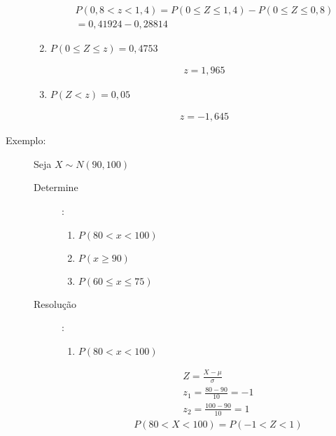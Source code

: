 \begin{description}
\begin{enumerate}[label=(\alph*)]
      \begin{align*}
        P(0,8 < z < 1,4)  = P(0 \leq Z \leq 1,4) - P(0 \leq Z \leq 0,8) \\
        = 0,41924 - 0,28814
      \end{align*}
    \item $P(0 \leq Z \leq z) = 0,4753$
\begin{figure}[H]
            \centering
            
          \end{figure}

      \begin{align*}
       z= 1,965 
      \end{align*}
    \item $P(Z < z) = 0,05$ \begin{figure}[H] \centering
            
          \end{figure}

      \begin{align*}
       z= -1,645 
      \end{align*}
      \end{enumerate}

    \item [Exemplo:] Seja $X \sim N(90,100)$ \\
      \begin{description}
        \item  [Determine]:
      \begin{enumerate}[label=(\alph*)]
        \item $P(80 < x < 100)$
        \item $P(x \geq  90)$
        \item $P(60 \leq x \leq 75 )$
      \end{enumerate}

    \item [Resolução]:
      \begin{enumerate}[label=(\alph*)]
        \item $P(80 < x < 100)$
          \begin{figure}[H]
            \centering
            
            \label{fig:}
          \end{figure}
          \begin{align*}
            Z= \frac{X-\mu  }{\sigma} \\
            z_1 = \frac{80-90}{10}=-1\\
            z_2 = \frac{100-90}{10}=1
          \end{align*}
                  \begin{align*}
           P(80<X < 100) = P(-1 < Z <1)
         \end{align*} 
 \begin{figure}[H]
            \centering
            
            \label{fig:}
          \end{figure}


\end{enumerate}
\end{description}
\end{description}
